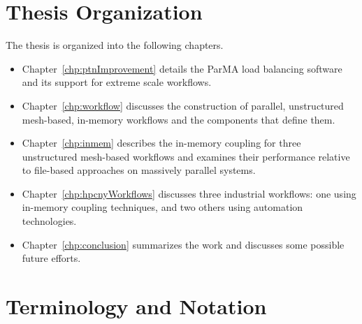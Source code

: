 \section{Thesis Organization}
The thesis is organized into the following chapters.
\begin{itemize}
  \item Chapter~\ref{chp:ptnImprovement} details the ParMA load balancing
    software and its support for extreme scale workflows.
  \item Chapter~\ref{chp:workflow} discusses the construction of parallel,
    unstructured mesh-based, in-memory workflows and the components that define
    them.
  \item Chapter~\ref{chp:inmem} describes the in-memory coupling for
    three unstructured mesh-based workflows and examines their performance
    relative to file-based approaches on massively parallel systems.
  \item Chapter~\ref{chp:hpcnyWorkflows} discusses three industrial workflows:
    one using in-memory coupling techniques, and two others using automation
    technologies.
  \item Chapter~\ref{chp:conclusion} summarizes the work and discusses some
    possible future efforts.
\end{itemize}

\section{Terminology and Notation}

